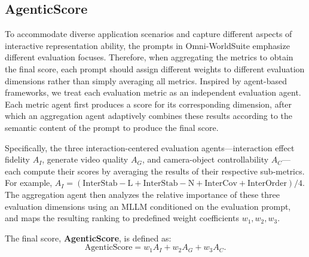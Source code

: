 


\subsection{AgenticScore}
\label{subsec:agentic_score}
To accommodate diverse application scenarios and capture different aspects of interactive representation ability, the prompts in Omni-WorldSuite emphasize different evaluation focuses. Therefore, when aggregating the metrics to obtain the final score, each prompt should assign different weights to different evaluation dimensions rather than simply averaging all metrics.
Inspired by agent-based frameworks, we treat each evaluation metric as an independent evaluation agent. Each metric agent first produces a score for its corresponding dimension, after which an aggregation agent adaptively combines these results according to the semantic content of the prompt to produce the final score.

Specifically, the three interaction-centered evaluation agents—interaction effect fidelity $A_I$, generate video quality $A_G$, and camera-object controllability $A_C$—each compute their scores by averaging the results of their respective sub-metrics. 
For example, $A_I = (\mathrm{InterStab-L}+\mathrm{InterStab-N}+\mathrm{InterCov} + \mathrm{InterOrder}) / 4$.
The aggregation agent then analyzes the relative importance of these three evaluation dimensions using an MLLM conditioned on the evaluation prompt, and maps the resulting ranking to predefined weight coefficients $w_1, w_2, w_3$.

The final score, \textbf{AgenticScore}, is defined as:
\begin{equation}
\mathrm{AgenticScore}
= w_1 A_I + w_2 A_G + w_3 A_C .
\end{equation}